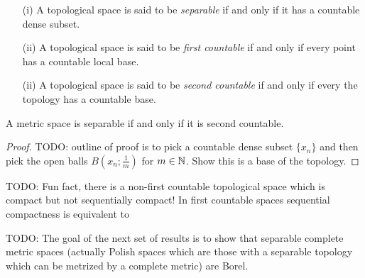 \begin{defn}
\begin{itemize}
\item[(i)]A topological space is said to be \emph{separable} if and
  only if it has a countable dense subset.
\item[(ii)]A topological space is said to be \emph{first countable} if and
  only if every point has a countable local base.
\item[(ii)]A topological space is said to be \emph{second countable} if and
  only if every the topology has a countable base.
\end{itemize}
\end{defn}
\begin{lem}A metric space is separable if and only if it is second countable.
\end{lem}
\begin{proof}
TODO:
outline of proof is to pick a countable dense subset $\lbrace x_n
\rbrace$ and then pick the open balls $B(x_n; \frac{1}{m})$ for $m \in
\mathbb{N}$.  Show this is a base of the topology.
\end{proof}

TODO:  Fun fact, there is a non-first countable topological space which is compact but not sequentially compact!  In first countable spaces sequential compactness is equivalent to 

TODO: The goal of the next set of results is to show that separable
complete metric spaces (actually Polish spaces which are those with
a separable topology which can be metrized by a complete metric) are Borel.


